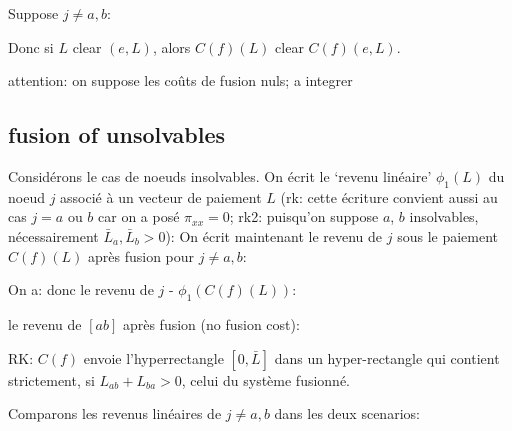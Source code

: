 \documentclass[11pt,oneside,twocolumn]{article}
\begin{document}
Suppose $j\neq a, b$:


Donc si $L$ clear $(e,L)$,
alors $C(f)(L)$ clear 
$C(f)(e,L)$.

attention: on suppose les co\^uts de fusion nuls; a integrer

\subsection{fusion of unsolvables} 
Considérons le cas de noeuds insolvables.
On écrit le `revenu linéaire' $\phi_1(L)$ du noeud $j$ associé à un vecteur de paiement $L$ (rk: cette écriture convient aussi au cas $j=a$ ou $b$ car on a posé $\pi_{xx}=0$; rk2: puisqu'on suppose  $a$, $b$ insolvables, nécessairement $\bar L_a,\bar L_b>0$):
On écrit maintenant le revenu de $j$
sous le paiement $C(f)(L)$ après fusion pour $j\neq a,b$:

On a:
donc le revenu de $j$ -
$\phi_1(C(f)(L))$:

le revenu de $[ab]$ après fusion (no fusion cost):

RK: $C(f)$ envoie l'hyperrectangle $[0,\bar L]$
dans un hyper-rectangle qui 
contient strictement, si
$L_{ab}+L_{ba}>0$, celui du système fusionné.

Comparons les revenus linéaires de $j\neq a,b$ dans les deux scenarios:

\end{document}
